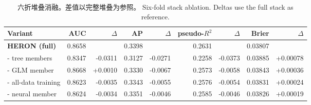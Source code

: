 \begin{table}[htbp]\centering\footnotesize
\caption{\ifzh
六折堆叠消融。差值以完整堆叠为参照。
\else
Six-fold stack ablation. Deltas use the full stack as reference.
\fi}\label{tab:ablation_stack}
\begin{adjustbox}{max width=\linewidth}
\begin{tabular}{lrrrrrrrr}\toprule
Variant & AUC & $\Delta$ & AP & $\Delta$ & pseudo-$R^2$ & $\Delta$ & Brier & $\Delta$ \\ \midrule
\textbf{HERON (full)} & 0.8658 &  & 0.3398 &  & 0.2631 &  & 0.03807 &  \\
- tree members & 0.8347 & -0.0311 & 0.3127 & -0.0271 & 0.2258 & -0.0373 & 0.03885 & +0.00078 \\
- GLM member & 0.8668 & +0.0010 & 0.3330 & -0.0067 & 0.2573 & -0.0058 & 0.03843 & +0.00036 \\
- all-data training & 0.8623 & -0.0035 & 0.3343 & -0.0055 & 0.2576 & -0.0054 & 0.03831 & +0.00024 \\
- neural member & 0.8624 & -0.0034 & 0.3351 & -0.0046 & 0.2585 & -0.0046 & 0.03826 & +0.00019 \\
\bottomrule\end{tabular}
\end{adjustbox}\end{table}